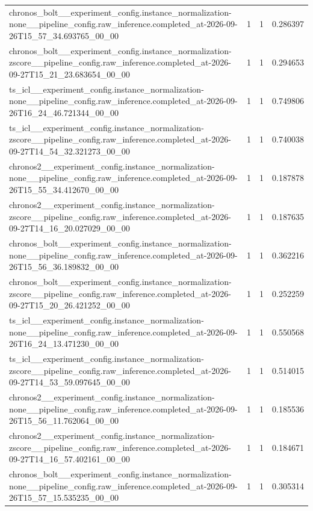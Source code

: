 \begin{tabular}{llll}
chronos\_bolt\_\_experiment\_config.instance\_normalization-none\_\_pipeline\_config.raw\_inference.completed\_at-2026-09-26T15\_57\_34.693765\_00\_00 & 1 & 1 & 0.286397 \\
chronos\_bolt\_\_experiment\_config.instance\_normalization-zscore\_\_pipeline\_config.raw\_inference.completed\_at-2026-09-27T15\_21\_23.683654\_00\_00 & 1 & 1 & 0.294653 \\
ts\_icl\_\_experiment\_config.instance\_normalization-none\_\_pipeline\_config.raw\_inference.completed\_at-2026-09-26T16\_24\_46.721344\_00\_00 & 1 & 1 & 0.749806 \\
ts\_icl\_\_experiment\_config.instance\_normalization-zscore\_\_pipeline\_config.raw\_inference.completed\_at-2026-09-27T14\_54\_32.321273\_00\_00 & 1 & 1 & 0.740038 \\
chronos2\_\_experiment\_config.instance\_normalization-none\_\_pipeline\_config.raw\_inference.completed\_at-2026-09-26T15\_55\_34.412670\_00\_00 & 1 & 1 & 0.187878 \\
chronos2\_\_experiment\_config.instance\_normalization-zscore\_\_pipeline\_config.raw\_inference.completed\_at-2026-09-27T14\_16\_20.027029\_00\_00 & 1 & 1 & 0.187635 \\
chronos\_bolt\_\_experiment\_config.instance\_normalization-none\_\_pipeline\_config.raw\_inference.completed\_at-2026-09-26T15\_56\_36.189832\_00\_00 & 1 & 1 & 0.362216 \\
chronos\_bolt\_\_experiment\_config.instance\_normalization-zscore\_\_pipeline\_config.raw\_inference.completed\_at-2026-09-27T15\_20\_26.421252\_00\_00 & 1 & 1 & 0.252259 \\
ts\_icl\_\_experiment\_config.instance\_normalization-none\_\_pipeline\_config.raw\_inference.completed\_at-2026-09-26T16\_24\_13.471230\_00\_00 & 1 & 1 & 0.550568 \\
ts\_icl\_\_experiment\_config.instance\_normalization-zscore\_\_pipeline\_config.raw\_inference.completed\_at-2026-09-27T14\_53\_59.097645\_00\_00 & 1 & 1 & 0.514015 \\
chronos2\_\_experiment\_config.instance\_normalization-none\_\_pipeline\_config.raw\_inference.completed\_at-2026-09-26T15\_56\_11.762064\_00\_00 & 1 & 1 & 0.185536 \\
chronos2\_\_experiment\_config.instance\_normalization-zscore\_\_pipeline\_config.raw\_inference.completed\_at-2026-09-27T14\_16\_57.402161\_00\_00 & 1 & 1 & 0.184671 \\
chronos\_bolt\_\_experiment\_config.instance\_normalization-none\_\_pipeline\_config.raw\_inference.completed\_at-2026-09-26T15\_57\_15.535235\_00\_00 & 1 & 1 & 0.305314 \\

\end{tabular}
